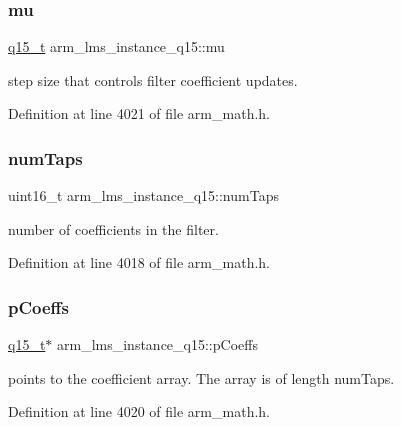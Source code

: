 \subsubsection{\texorpdfstring{mu}{mu}}
{\footnotesize\ttfamily \hyperlink{arm__math_8h_ab5a8fb21a5b3b983d5f54f31614052ea}{q15\+\_\+t} arm\+\_\+lms\+\_\+instance\+\_\+q15\+::mu}

step size that controls filter coefficient updates. 

Definition at line 4021 of file arm\+\_\+math.\+h.

\mbox{\label{structarm__lms__instance__q15_a0078e894f805af1b360369e619fb57b3}} 
\subsubsection{\texorpdfstring{num\+Taps}{numTaps}}
{\footnotesize\ttfamily uint16\+\_\+t arm\+\_\+lms\+\_\+instance\+\_\+q15\+::num\+Taps}

number of coefficients in the filter. 

Definition at line 4018 of file arm\+\_\+math.\+h.

\mbox{\label{structarm__lms__instance__q15_a42f95368b94898eb82608e1113d18cab}} 
\subsubsection{\texorpdfstring{p\+Coeffs}{pCoeffs}}
{\footnotesize\ttfamily \hyperlink{arm__math_8h_ab5a8fb21a5b3b983d5f54f31614052ea}{q15\+\_\+t}$\ast$ arm\+\_\+lms\+\_\+instance\+\_\+q15\+::p\+Coeffs}

points to the coefficient array. The array is of length num\+Taps. 

Definition at line 4020 of file arm\+\_\+math.\+h.

\mbox{\label{structarm__lms__instance__q15_acca5fbaef4a52ae411de24c9a0b929cf}} 
